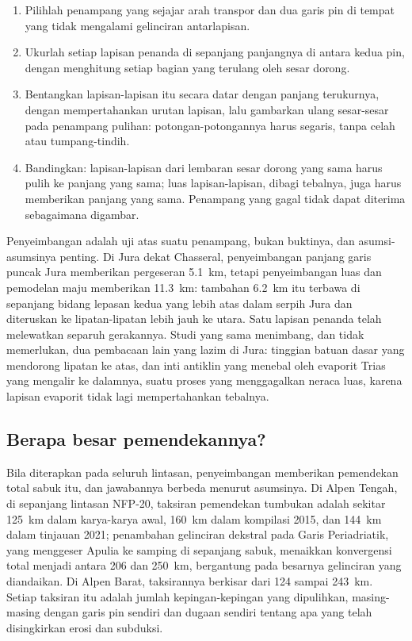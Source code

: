 \begin{method}\label{met:b2:alpine-orogen:restore}
\begin{enumerate}
\item Pilihlah penampang yang sejajar arah transpor dan dua garis pin di tempat yang tidak mengalami
gelinciran antarlapisan.
\item Ukurlah setiap lapisan penanda di sepanjang panjangnya di antara kedua pin, dengan menghitung setiap bagian
yang terulang oleh sesar dorong.
\item Bentangkan lapisan-lapisan itu secara datar dengan panjang terukurnya, dengan mempertahankan urutan lapisan,
lalu gambarkan ulang sesar-sesar pada penampang pulihan: potongan-potongannya harus segaris, tanpa celah
atau tumpang-tindih.
\item Bandingkan: lapisan-lapisan dari lembaran sesar dorong yang sama harus pulih ke panjang yang sama; luas
lapisan-lapisan, dibagi tebalnya, juga harus memberikan panjang yang sama. Penampang yang
gagal tidak dapat diterima sebagaimana digambar.
\end{enumerate}
\end{method}

Penyeimbangan adalah uji atas suatu penampang, bukan buktinya, dan asumsi-asumsinya penting. Di Jura
dekat Chasseral, penyeimbangan panjang garis puncak Jura memberikan pergeseran \qty{5.1}{km},
tetapi penyeimbangan luas dan pemodelan maju memberikan \qty{11.3}{km}: tambahan
\qty{6.2}{km} itu terbawa di sepanjang bidang lepasan kedua yang lebih atas dalam serpih Jura dan diteruskan
ke lipatan-lipatan lebih jauh ke utara. Satu lapisan penanda telah melewatkan separuh gerakannya. Studi yang sama
menimbang, dan tidak memerlukan, dua pembacaan lain yang lazim di Jura: tinggian batuan dasar yang mendorong
lipatan ke atas, dan inti antiklin yang menebal oleh evaporit Trias yang mengalir ke dalamnya, suatu
proses yang menggagalkan neraca luas, karena lapisan evaporit tidak lagi mempertahankan
tebalnya.

\subsection*{Berapa besar pemendekannya?}

Bila diterapkan pada seluruh lintasan, penyeimbangan memberikan pemendekan total sabuk itu, dan jawabannya
berbeda menurut asumsinya. Di Alpen Tengah, di sepanjang lintasan NFP-20, taksiran
pemendekan tumbukan adalah sekitar \qty{125}{km} dalam karya-karya awal, \qty{160}{km} dalam
kompilasi 2015, dan \qty{144}{km} dalam tinjauan 2021; penambahan gelinciran dekstral pada Garis Periadriatik, yang
menggeser Apulia ke samping di sepanjang sabuk, menaikkan konvergensi total menjadi antara 206 dan
\qty{250}{km}, bergantung pada besarnya gelinciran yang diandaikan. Di Alpen Barat, taksirannya
berkisar dari 124 sampai \qty{243}{km}. Setiap taksiran itu adalah jumlah kepingan-kepingan yang dipulihkan, masing-masing dengan
garis pin sendiri dan dugaan sendiri tentang apa yang telah disingkirkan erosi dan subduksi.


